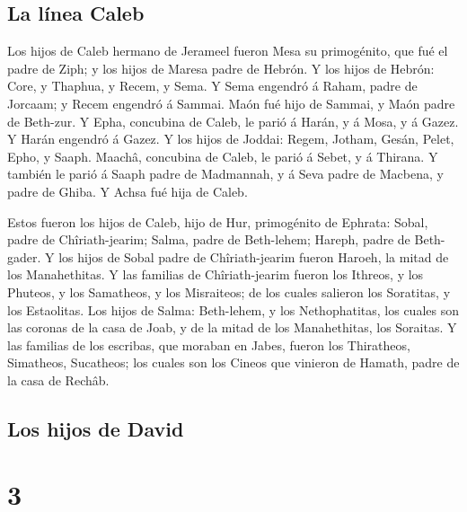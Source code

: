 \hypertarget{la-luxednea-caleb-1}{%
\subsection{La línea Caleb}\label{la-luxednea-caleb-1}}

 Los hijos de Caleb hermano de Jerameel fueron Mesa su
primogénito, que fué el padre de Ziph; y los hijos de Maresa padre de
Hebrón.  Y los hijos de Hebrón: Core, y Thaphua, y Recem,
y Sema.  Y Sema engendró á Raham, padre de Jorcaam; y
Recem engendró á Sammai.  Maón fué hijo de Sammai, y Maón
padre de Beth-zur.  Y Epha, concubina de Caleb, le parió
á Harán, y á Mosa, y á Gazez. Y Harán engendró á Gazez. 
Y los hijos de Joddai: Regem, Jotham, Gesán, Pelet, Epho, y Saaph.
 Maachâ, concubina de Caleb, le parió á Sebet, y á
Thirana.  Y también le parió á Saaph padre de Madmannah,
y á Seva padre de Macbena, y padre de Ghiba. Y Achsa fué hija de Caleb.

 Estos fueron los hijos de Caleb, hijo de Hur,
primogénito de Ephrata: Sobal, padre de Chîriath-jearim; 
Salma, padre de Beth-lehem; Hareph, padre de Beth-gader. 
Y los hijos de Sobal padre de Chîriath-jearim fueron Haroeh, la mitad de
los Manahethitas.  Y las familias de Chîriath-jearim
fueron los Ithreos, y los Phuteos, y los Samatheos, y los Misraiteos; de
los cuales salieron los Soratitas, y los Estaolitas.  Los
hijos de Salma: Beth-lehem, y los Nethophatitas, los cuales son las
coronas de la casa de Joab, y de la mitad de los Manahethitas, los
Soraitas.  Y las familias de los escribas, que moraban en
Jabes, fueron los Thiratheos, Simatheos, Sucatheos; los cuales son los
Cineos que vinieron de Hamath, padre de la casa de Rechâb.

\hypertarget{los-hijos-de-david}{%
\subsection{Los hijos de David}\label{los-hijos-de-david}}

\hypertarget{section-13-3}{%
\section{3}\label{section-13-3}}

